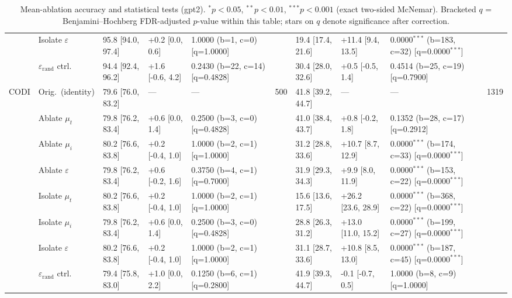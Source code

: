 \begin{table}[h!]
\begin{tabular}{ll lllc lllc}
 & Isolate $\varepsilon$ & 95.8 [94.0, 97.4] & +0.2 [0.0, 0.6] & 1.0000 (b=1, c=0) [q=1.0000] &  & 19.4 [17.4, 21.6] & +11.4 [9.4, 13.5] & 0.0000$^{***}$ (b=183, c=32) [q=0.0000$^{***}$] &  \\
 & $\varepsilon_\mathrm{rand}$ ctrl. & 94.4 [92.4, 96.2] & +1.6 [-0.6, 4.2] & 0.2430 (b=22, c=14) [q=0.4828] &  & 30.4 [28.0, 32.6] & +0.5 [-0.5, 1.4] & 0.4514 (b=25, c=19) [q=0.7900] &  \\
\cmidrule(lr){2-10}
\multirow{8}{*}{CODI} & Orig.\ (identity) & 79.6 [76.0, 83.2] & --- & --- & 500 & 41.8 [39.2, 44.7] & --- & --- & 1319 \\
 & Ablate $\mu_t$ & 79.8 [76.2, 83.4] & +0.6 [0.0, 1.4] & 0.2500 (b=3, c=0) [q=0.4828] &  & 41.0 [38.4, 43.7] & +0.8 [-0.2, 1.8] & 0.1352 (b=28, c=17) [q=0.2912] &  \\
 & Ablate $\mu_i$ & 80.2 [76.6, 83.8] & +0.2 [-0.4, 1.0] & 1.0000 (b=2, c=1) [q=1.0000] &  & 31.2 [28.8, 33.6] & +10.7 [8.7, 12.9] & 0.0000$^{***}$ (b=174, c=33) [q=0.0000$^{***}$] &  \\
 & Ablate $\varepsilon$ & 79.8 [76.2, 83.4] & +0.6 [-0.2, 1.6] & 0.3750 (b=4, c=1) [q=0.7000] &  & 31.9 [29.3, 34.3] & +9.9 [8.0, 11.9] & 0.0000$^{***}$ (b=153, c=22) [q=0.0000$^{***}$] &  \\
 & Isolate $\mu_t$ & 80.2 [76.6, 83.8] & +0.2 [-0.4, 1.0] & 1.0000 (b=2, c=1) [q=1.0000] &  & 15.6 [13.6, 17.5] & +26.2 [23.6, 28.9] & 0.0000$^{***}$ (b=368, c=22) [q=0.0000$^{***}$] &  \\
 & Isolate $\mu_i$ & 79.8 [76.2, 83.4] & +0.6 [0.0, 1.4] & 0.2500 (b=3, c=0) [q=0.4828] &  & 28.8 [26.3, 31.2] & +13.0 [11.0, 15.2] & 0.0000$^{***}$ (b=199, c=27) [q=0.0000$^{***}$] &  \\
 & Isolate $\varepsilon$ & 80.2 [76.6, 83.8] & +0.2 [-0.4, 1.0] & 1.0000 (b=2, c=1) [q=1.0000] &  & 31.1 [28.7, 33.6] & +10.8 [8.5, 13.0] & 0.0000$^{***}$ (b=187, c=45) [q=0.0000$^{***}$] &  \\
 & $\varepsilon_\mathrm{rand}$ ctrl. & 79.4 [75.8, 83.0] & +1.0 [0.0, 2.2] & 0.1250 (b=6, c=1) [q=0.2800] &  & 41.9 [39.3, 44.7] & -0.1 [-0.7, 0.5] & 1.0000 (b=8, c=9) [q=1.0000] &  \\
\bottomrule
\end{tabular}
\caption{Mean-ablation accuracy and statistical tests (gpt2). $^{*}p{<}0.05$, $^{**}p{<}0.01$, $^{***}p{<}0.001$ (exact two-sided McNemar). Bracketed $q$ = Benjamini--Hochberg FDR-adjusted $p$-value within this table; stars on $q$ denote significance after correction.}
\label{tab:mean_ablation_stats_gpt2}
\end{table}
